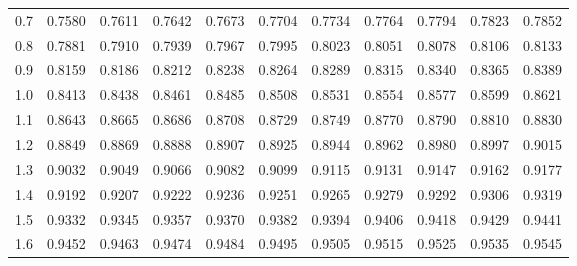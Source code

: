 \documentclass[11pt]{article}
\begin{document}
\begin{table}[h]
\begin{center}
\begin{tabular}{c | rrrrr | rrrrr |}
  0.7 & \scriptsize{0.7580} & \scriptsize{0.7611} & \scriptsize{0.7642} & \scriptsize{0.7673} & \scriptsize{0.7704} & \scriptsize{0.7734} & \scriptsize{0.7764} & \scriptsize{0.7794} & \scriptsize{0.7823} & \scriptsize{0.7852} \\
  0.8 & \scriptsize{0.7881} & \scriptsize{0.7910} & \scriptsize{0.7939} & \scriptsize{0.7967} & \scriptsize{0.7995} & \scriptsize{0.8023} & \scriptsize{0.8051} & \scriptsize{0.8078} & \scriptsize{0.8106} & \scriptsize{0.8133} \\
  0.9 & \scriptsize{0.8159} & \scriptsize{0.8186} & \scriptsize{0.8212} & \scriptsize{0.8238} & \scriptsize{0.8264} & \scriptsize{0.8289} & \scriptsize{0.8315} & \scriptsize{0.8340} & \scriptsize{0.8365} & \scriptsize{0.8389} \\
  \hline
  \hline
  1.0 & \scriptsize{0.8413} & \scriptsize{0.8438} & \scriptsize{0.8461} & \scriptsize{0.8485} & \scriptsize{0.8508} & \scriptsize{0.8531} & \scriptsize{0.8554} & \scriptsize{0.8577} & \scriptsize{0.8599} & \scriptsize{0.8621} \\
  1.1 & \scriptsize{0.8643} & \scriptsize{0.8665} & \scriptsize{0.8686} & \scriptsize{0.8708} & \scriptsize{0.8729} & \scriptsize{0.8749} & \scriptsize{0.8770} & \scriptsize{0.8790} & \scriptsize{0.8810} & \scriptsize{0.8830} \\
  1.2 & \scriptsize{0.8849} & \scriptsize{0.8869} & \scriptsize{0.8888} & \scriptsize{0.8907} & \scriptsize{0.8925} & \scriptsize{0.8944} & \scriptsize{0.8962} & \scriptsize{0.8980} & \scriptsize{0.8997} & \scriptsize{0.9015} \\
  1.3 & \scriptsize{0.9032} & \scriptsize{0.9049} & \scriptsize{0.9066} & \scriptsize{0.9082} & \scriptsize{0.9099} & \scriptsize{0.9115} & \scriptsize{0.9131} & \scriptsize{0.9147} & \scriptsize{0.9162} & \scriptsize{0.9177} \\
  1.4 & \scriptsize{0.9192} & \scriptsize{0.9207} & \scriptsize{0.9222} & \scriptsize{0.9236} & \scriptsize{0.9251} & \scriptsize{0.9265} & \scriptsize{0.9279} & \scriptsize{0.9292} & \scriptsize{0.9306} & \scriptsize{0.9319} \\
  \hline
  1.5 & \scriptsize{0.9332} & \scriptsize{0.9345} & \scriptsize{0.9357} & \scriptsize{0.9370} & \scriptsize{0.9382} & \scriptsize{0.9394} & \scriptsize{0.9406} & \scriptsize{0.9418} & \scriptsize{0.9429} & \scriptsize{0.9441} \\
  1.6 & \scriptsize{0.9452} & \scriptsize{0.9463} & \scriptsize{0.9474} & \scriptsize{0.9484} & \scriptsize{0.9495} & \scriptsize{0.9505} & \scriptsize{0.9515} & \scriptsize{0.9525} & \scriptsize{0.9535} & \scriptsize{0.9545} \\

\end{tabular}
\end{center}
\end{table}
\end{document}
